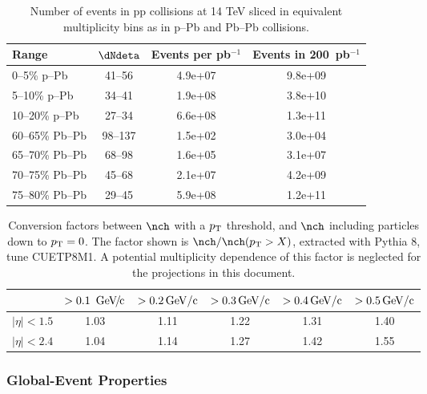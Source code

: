 \documentclass[../report.tex]{subfiles}
\begin{document}
\begin{table}
\centering
\begin{tabular}{l|c|c|c}
Range & $\dNdeta$ & Events per pb$^{-1}$ & Events in 200~pb$^{-1}$ \\
\hline
0--5\% p--Pb   & 41--56        & 4.9e+07       & 9.8e+09 \\
5--10\% p--Pb  & 34--41        & 1.9e+08       & 3.8e+10 \\
10--20\% p--Pb & 27--34        & 6.6e+08       & 1.3e+11 \\
\hline
60--65\% Pb--Pb    & 98--137       & 1.5e+02       & 3.0e+04 \\
65--70\% Pb--Pb    & 68--98        & 1.6e+05       & 3.1e+07 \\ 
70--75\% Pb--Pb    & 45--68        & 2.1e+07       & 4.2e+09 \\
75--80\% Pb--Pb    & 29--45        & 5.9e+08       & 1.2e+11 \\
\hline
\end{tabular}
\caption{Number of events in pp collisions at 14 TeV sliced in equivalent multiplicity bins as in p--Pb and Pb--Pb collisions.}
\label{tab:smallsystems_pbpb}
\end{table}

\begin{table}
\centering
\begin{tabular}{c|c|c|c|c|c}
\backslashbox{$|\eta|$}{$\pT$} & $> \unit[0.1]{\UGeVc}$ & $> \unit[0.2]{GeV/c}$ & $> \unit[0.3]{GeV/c}$ & $> \unit[0.4]{GeV/c}$ & $> \unit[0.5]{GeV/c}$ \\
\hline
$|\eta| < 1.5$ & 1.03 & 1.11 & 1.22 & 1.31 & 1.40 \\
\hline
$|\eta| < 2.4$ & 1.04 & 1.14 & 1.27 & 1.42 & 1.55 \\
\hline
\end{tabular}
\caption{Conversion factors between $\nch$ with a $\pT$ threshold, and $\nch$ including particles down to $p\sb{\scriptstyle\mathrm{T}} = 0$. The factor shown is $\nch / \nch(\pT > X)$, extracted with Pythia 8, tune CUETP8M1. A potential multiplicity dependence of this factor is neglected for the projections in this document.}
\label{tab:smallsystems_conversion}
\end{table}

\subsubsection{Global-Event Properties}
\end{document}
